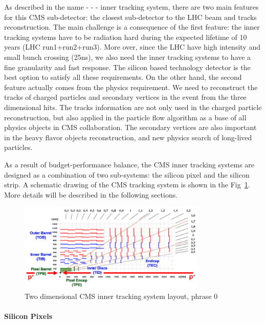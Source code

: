 As described in the name - - - inner tracking system, there are two main features for this CMS sub-detector: the closest sub-detector to the LHC beam and tracks reconstruction. The main challenge is a consequence of the first feature: the inner tracking systems have to be radiation hard during the expected lifetime of 10 years (LHC run1+run2+run3). More over, since the LHC have high intensity and small bunch crossing (25ns), we also need the inner tracking systems to have a fine granularity and fast response. The silicon based technology detector is the best option to satisfy all these requirements. On the other hand, the second feature actually comes from the physics requirement. We need to reconstruct the tracks of charged particles and secondary vertices in the event from the three dimensional hits. The tracks information are not only used in the charged particle reconstruction, but also applied in the particle flow algorithm as a base of all physics objects in CMS collaboration. The secondary vertices are also important in the heavy flavor objects reconstruction, and new physics search of long-lived particles. 

As a result of budget-performance balance, the CMS inner tracking systems are designed as a combination of two sub-systems: the silicon pixel and the silicon strip. A schematic drawing of the CMS tracking system is shown in the Fig~\ref{fig:c3cms2dtracker}. More details will be described in the following sections. 

\begin{figure}[htbp]
 \begin{center}
  \includegraphics[width=0.8\textwidth]{figures/c3/c3_cms_2dtracker.png}
 \end{center}
 \caption{Two dimensional CMS inner tracking system layout, phrase 0}
 \label{fig:c3cms2dtracker}
\end{figure}

\paragraph{Silicon Pixels}


